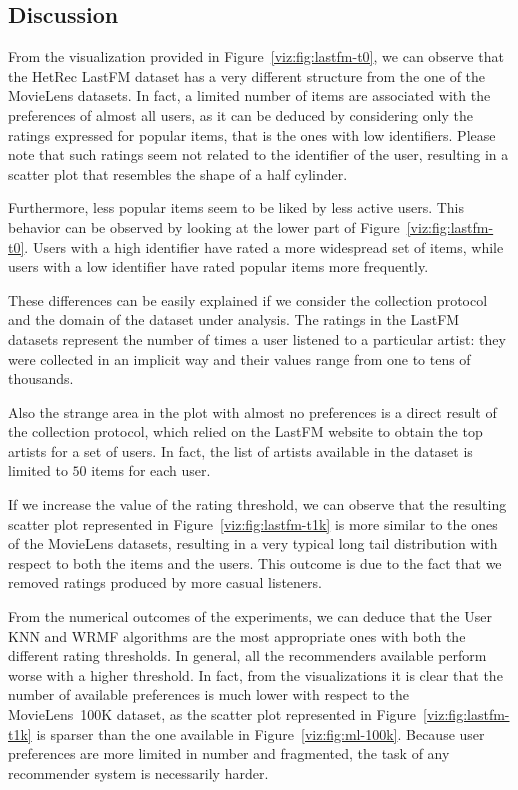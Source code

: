 \subsection{Discussion}

From the visualization provided in Figure~\ref{viz:fig:lastfm-t0}, we can observe that the HetRec LastFM dataset has a very different structure from the one of the MovieLens datasets. In fact, a limited number of items are associated with the preferences of almost all users, as it can be deduced by considering only the ratings expressed for popular items, that is the ones with low identifiers. Please note that such ratings seem not related to the identifier of the user, resulting in a scatter plot that resembles the shape of a half cylinder.

Furthermore, less popular items seem to be liked by less active users. This behavior can be observed by looking at the lower part of Figure~\ref{viz:fig:lastfm-t0}. Users with a high identifier have rated a more widespread set of items, while users with a low identifier have rated popular items more frequently.

These differences can be easily explained if we consider the collection protocol and the domain of the dataset under analysis. The ratings in the LastFM datasets represent the number of times a user listened to a particular artist: they were collected in an implicit way and their values range from one to tens of thousands.

Also the strange area in the plot with almost no preferences is a direct result of the collection protocol, which relied on the LastFM website to obtain the top artists for a set of users. In fact, the list of artists available in the dataset is limited to $50$ items for each user.

If we increase the value of the rating threshold, we can observe that the resulting scatter plot represented in Figure~\ref{viz:fig:lastfm-t1k} is more similar to the ones of the MovieLens datasets, resulting in a very typical long tail distribution with respect to both the items and the users. This outcome is due to the fact that we removed ratings produced by more casual listeners.

From the numerical outcomes of the experiments, we can deduce that the User KNN and WRMF algorithms are the most appropriate ones with both the different rating thresholds. In general, all the recommenders available perform worse with a higher threshold. In fact, from the visualizations it is clear that the number of available preferences is much lower with respect to the MovieLens~100K dataset, as the scatter plot represented in Figure~\ref{viz:fig:lastfm-t1k} is sparser than the one available in Figure~\ref{viz:fig:ml-100k}. Because user preferences are more limited in number and fragmented, the task of any recommender system is necessarily harder.

